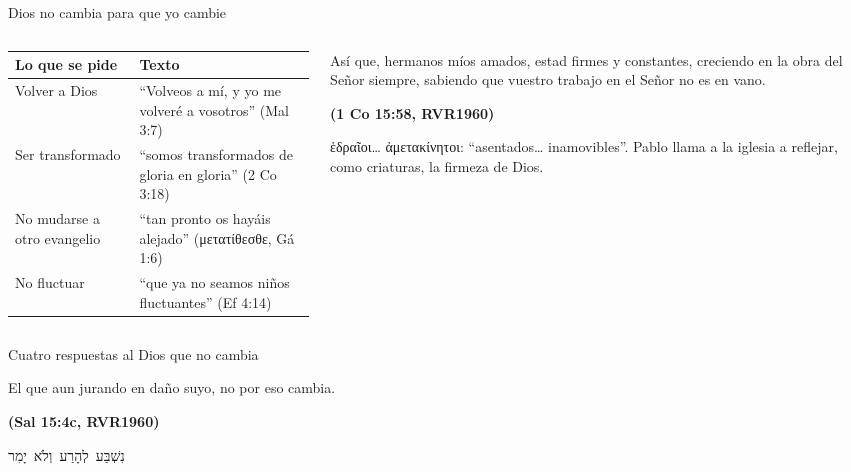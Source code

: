 \documentclass[hyperref={bookmarks=false},aspectratio=169]{beamer}
\newcommand{\heb}[1]{\mbox{\foreignlanguage{hebrew}{#1}}}
\newcommand{\grc}[1]{\foreignlanguage{ancientgreek}{#1}}
\newcommand{\fuente}[1]{\par\hfill{\upshape\bfseries\footnotesize\textcolor{azul}{#1}}}
\begin{document}
\begin{frame}{Dios no cambia para que yo cambie}
\begin{columns}[t,onlytextwidth]
\begin{column}{0.50\textwidth}
\scriptsize\renewcommand{\arraystretch}{1.2}
\begin{tabular}{@{}>{\RaggedRight\arraybackslash}p{2.6cm}>{\RaggedRight\arraybackslash}p{3.1cm}@{}}
\toprule
\textbf{Lo que se pide} & \textbf{Texto} \\ \midrule
Volver a Dios & ``Volveos a mí, y yo me volveré a vosotros'' (Mal 3:7) \\
Ser transformado & ``somos transformados de gloria en gloria'' (2 Co 3:18) \\
No mudarse a otro evangelio & ``tan pronto os hayáis alejado'' (\grc{μετατίθεσθε}, Gá 1:6) \\
No fluctuar & ``que ya no seamos niños fluctuantes'' (Ef 4:14) \\
\bottomrule
\end{tabular}
\end{column}
\begin{column}{0.48\textwidth}
\begin{cita}Así que, hermanos míos amados, estad firmes y constantes, creciendo en la obra del Señor siempre, sabiendo que vuestro trabajo en el Señor no es en vano.\fuente{(1 Co 15:58, RVR1960)}\end{cita}
\scriptsize \grc{ἑδραῖοι\ldots{} ἀμετακίνητοι}: ``asentados\ldots{} inamovibles''. Pablo llama a la iglesia a reflejar, como criaturas, la firmeza de Dios.
\end{column}
\end{columns}
\end{frame}

\begin{frame}{Cuatro respuestas al Dios que no cambia}
\centering
{}\par\medskip
\begin{cita}El que aun jurando en daño suyo, no por eso cambia.\fuente{(Sal 15:4c, RVR1960)}\end{cita}
\centering\heb{נִשְׁבַּע לְהָרַע וְלֹא יָמִר}
\end{frame}
\end{document}

